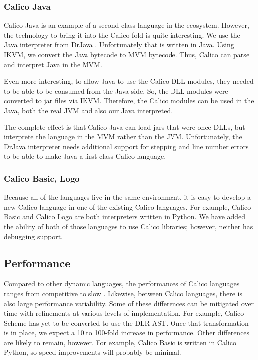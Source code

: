 \documentclass[preprint]{sigplanconf}
\begin{document}
\subsubsection{Calico Java}

Calico Java is an example of a second-class language in the
ecosystem. However, the technology to bring it into the Calico fold is
quite interesting. We use the Java interpreter from DrJava
\cite{drjava}. Unfortunately that is written in Java. Using IKVM, we
convert the Java bytecode to MVM bytecode. Thus, Calico can parse and
interpret Java in the MVM. 

Even more interesting, to allow Java to use the Calico DLL modules,
they needed to be able to be consumed from the Java side. So, the DLL
modules were converted to jar files via IKVM. Therefore, the Calico
modules can be used in the Java, both the real JVM and also our Java
interpreted.

The complete effect is that Calico Java can load jars that were once
DLLs, but interprete the language in the MVM rather than the
JVM. Unfortunately, the DrJava interpreter needs additional support
for stepping and line number errors to be able to make Java a
first-class Calico language.

\subsubsection{Calico Basic, Logo}

Because all of the languages live in the same environment, it is easy
to develop a new Calico language in one of the existing Calico
languages. For example, Calico Basic and Calico Logo are both
interpreters written in Python. We have added the ability of both of
those languages to use Calico libraries; however, neither has
debugging support.

\subsection{Performance}

Compared to other dynamic languages, the performances of Calico
languages ranges from competitive to slow
\cite{python-benchmark}. Likewise, between Calico languages, there is
also large performance variability. Some of these differences can be
mitigated over time with refinements at various levels of
implementation. For example, Calico Scheme has yet to be converted to
use the DLR AST. Once that transformation is in place, we expect a 10
to 100-fold increase in performance. Other differences are likely to
remain, however. For example, Calico Basic is written in Calico
Python, so speed improvements will probably be minimal.
\end{document}

